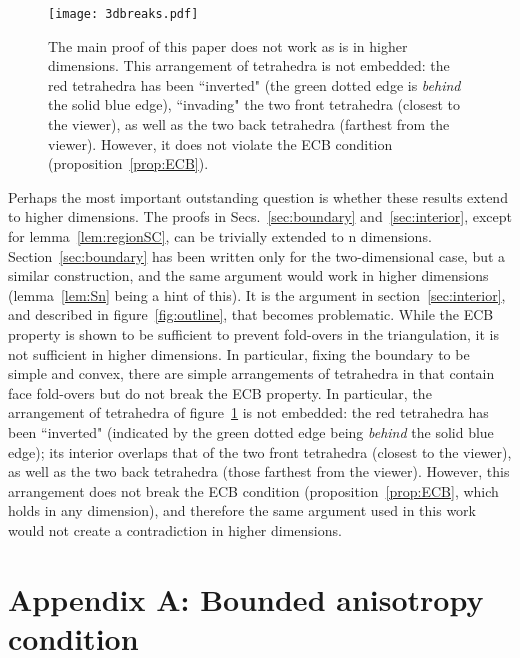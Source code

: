 \documentclass[11pt]{article}
\begin{document}
\begin{figure}[ht]
\centering
\texttt{[image: 3dbreaks.pdf]}
\caption{
	The main proof of this paper does not work as is in higher dimensions. 
This arrangement of tetrahedra is not embedded: 
	the red tetrahedra has been ``inverted" 
	(the green dotted edge is \emph{behind} the solid blue edge), 
	``invading" the two front tetrahedra (closest to the viewer), 
	as well as the two back tetrahedra (farthest from the viewer). 
However, it does not violate the ECB condition (proposition~\ref{prop:ECB}). 
}
\label{fig:3dbreaks}
\end{figure}
Perhaps the most important outstanding question is whether these results
extend to higher dimensions. The proofs in Secs.~\ref{sec:boundary} and~\ref{sec:interior},
except for lemma~\ref{lem:regionSC}, can be trivially extended to n dimensions. 
Section~\ref{sec:boundary} has been written only for the two-dimensional case,
but a similar construction, and the same argument would work in higher
dimensions (lemma~\ref{lem:Sn} being a hint of this). 
It is the argument in section~\ref{sec:interior}, and described in figure~\ref{fig:outline}, that becomes problematic. 
While the ECB property is shown to be sufficient to prevent fold-overs in the
triangulation, it is not sufficient in 
higher dimensions. In particular, fixing the boundary to be simple and convex, 
there are simple arrangements of tetrahedra in  that contain 
face fold-overs but do not break the ECB property. 
In particular, the arrangement of tetrahedra of figure~\ref{fig:3dbreaks} is not embedded: 
	the red tetrahedra has been ``inverted" 
	(indicated by the green dotted edge being \emph{behind} the solid blue edge); 
	its interior overlaps that of the two front tetrahedra (closest to the viewer), 
	as well as the two back tetrahedra (those farthest from the viewer). 
However, this arrangement does not break the ECB condition (proposition~\ref{prop:ECB}, which holds in any dimension), 
	and therefore the same argument used in this work would not create a 
	contradiction in higher dimensions. 














\section*{Appendix A: Bounded anisotropy condition}\label{app:gamma}
\end{document}
